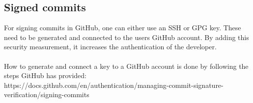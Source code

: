 \subsection{Signed commits}
For signing commits in GitHub, one can either use an SSH or GPG key. These need to be generated and connected to the users GitHub account. By adding this security measurement, it increases the authentication of the developer. 
\\~\\
How to generate and connect a key to a GitHub account is done by following the steps GitHub has provided:\\
https://docs.github.com/en/authentication/managing-commit-signature-verification/signing-commits

